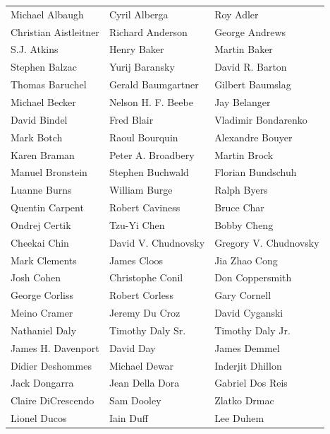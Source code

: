 \begin{tabular}{lll}
Michael Albaugh        & Cyril Alberga          & Roy Adler\\
Christian Aistleitner  & Richard Anderson       & George Andrews\\
S.J. Atkins            & Henry Baker            & Martin Baker\\
Stephen Balzac         & Yurij Baransky         & David R. Barton\\
Thomas Baruchel        & Gerald Baumgartner     & Gilbert Baumslag\\
Michael Becker         & Nelson H. F. Beebe     & Jay Belanger\\
David Bindel           & Fred Blair             & Vladimir Bondarenko\\
Mark Botch             & Raoul Bourquin         & Alexandre Bouyer\\
Karen Braman           & Peter A. Broadbery     & Martin Brock\\
Manuel Bronstein       & Stephen Buchwald       & Florian Bundschuh\\
Luanne Burns           & William Burge          & Ralph Byers\\
Quentin Carpent        & Robert Caviness        & Bruce Char\\
Ondrej Certik          & Tzu-Yi Chen            & Bobby Cheng\\
Cheekai Chin           & David V. Chudnovsky    & Gregory V. Chudnovsky\\
Mark Clements          & James Cloos            & Jia Zhao Cong\\
Josh Cohen             & Christophe Conil       & Don Coppersmith\\
George Corliss         & Robert Corless         & Gary Cornell\\
Meino Cramer           & Jeremy Du Croz         & David Cyganski\\
Nathaniel Daly         & Timothy Daly Sr.       & Timothy Daly Jr.\\
James H. Davenport     & David Day              & James Demmel\\
Didier Deshommes       & Michael Dewar          & Inderjit Dhillon\\
Jack Dongarra          & Jean Della Dora        & Gabriel Dos Reis\\
Claire DiCrescendo     & Sam Dooley             & Zlatko Drmac\\
Lionel Ducos           & Iain Duff              & Lee Duhem\\

\end{tabular}
